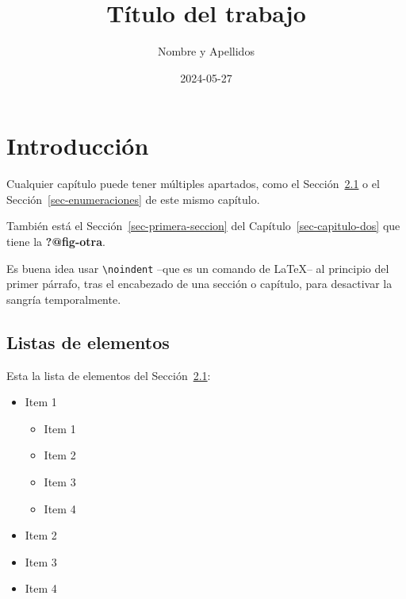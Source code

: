 \documentclass[
  letterpaper,
  DIV=11,
  numbers=noendperiod]{scrreprt}
\title{Título del trabajo}
\author{Nombre y Apellidos}
\date{2024-05-27}
\providecommand{\tightlist}{%
  \setlength{\itemsep}{0pt}\setlength{\parskip}{0pt}}\usepackage{longtable,booktabs,array}
\renewcommand*\contentsname{Tabla de contenidos}
\newcommand\contentsname{Tabla de contenidos}
\begin{document}
\maketitle

\renewcommand*\contentsname{Tabla de contenidos}
{
\hypersetup{linkcolor=}
\setcounter{tocdepth}{2}
\tableofcontents
}

\chapter{}\label{section}


\chapter{Introducción}\label{sec-introduccion}

\noindent Cualquier capítulo puede tener múltiples apartados, como el
Sección~\ref{sec-lista-de-items} o el Sección~\ref{sec-enumeraciones} de
este mismo capítulo.

También está el Sección~\ref{sec-primera-seccion} del
Capítulo~\ref{sec-capitulo-dos} que tiene la \textbf{?@fig-otra}.

Es buena idea usar \texttt{\textbackslash{}noindent} --que es un comando
de \LaTeX{}-- al principio del primer párrafo, tras el encabezado de una
sección o capítulo, para desactivar la sangría temporalmente.

\section{Listas de elementos}\label{sec-lista-de-items}

\noindent Esta la lista de elementos del
Sección~\ref{sec-lista-de-items}:

\begin{itemize}
\tightlist
\item
  Item 1

  \begin{itemize}
  \tightlist
  \item
    Item 1
  \item
    Item 2
  \item
    Item 3
  \item
    Item 4
  \end{itemize}
\item
  Item 2
\item
  Item 3
\item
  Item 4
\end{itemize}
\end{document}
